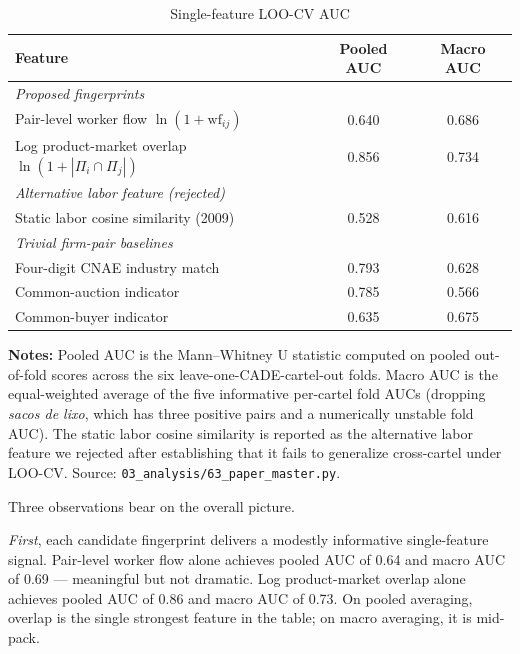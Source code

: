 \begin{table}[htbp]
\centering
\caption{Single-feature LOO-CV AUC}\label{tab:single_auc}
\small
\begin{tabular}{lcc}
\toprule
Feature & Pooled AUC & Macro AUC \\
\midrule
\emph{Proposed fingerprints} \\
\quad Pair-level worker flow $\ln(1 + \mathrm{wf}_{ij})$        & 0.640 & 0.686 \\
\quad Log product-market overlap $\ln(1 + |\Pi_i \cap \Pi_j|)$  & 0.856 & 0.734 \\[4pt]
\emph{Alternative labor feature (rejected)} \\
\quad Static labor cosine similarity (2009) & 0.528 & 0.616 \\[4pt]
\emph{Trivial firm-pair baselines} \\
\quad Four-digit CNAE industry match                            & 0.793 & 0.628 \\
\quad Common-auction indicator                                   & 0.785 & 0.566 \\
\quad Common-buyer indicator                                     & 0.635 & 0.675 \\
\bottomrule
\end{tabular}
\vspace{0.5em}
\begin{minipage}{0.95\textwidth}
\scriptsize{\textbf{Notes:} Pooled AUC is the Mann--Whitney U statistic computed on pooled out-of-fold scores across the six leave-one-CADE-cartel-out folds. Macro AUC is the equal-weighted average of the five informative per-cartel fold AUCs (dropping \emph{sacos de lixo}, which has three positive pairs and a numerically unstable fold AUC). The static labor cosine similarity is reported as the alternative labor feature we rejected after establishing that it fails to generalize cross-cartel under LOO-CV. Source: \texttt{03\_analysis/63\_paper\_master.py}.\par}
\end{minipage}
\end{table}

Three observations bear on the overall picture.

\emph{First}, each candidate fingerprint delivers a modestly informative single-feature signal. Pair-level worker flow alone achieves pooled AUC of 0.64 and macro AUC of 0.69 --- meaningful but not dramatic. Log product-market overlap alone achieves pooled AUC of 0.86 and macro AUC of 0.73. On pooled averaging, overlap is the single strongest feature in the table; on macro averaging, it is mid-pack.


